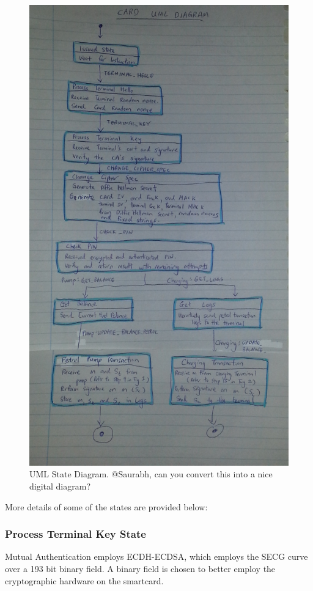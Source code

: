 \documentclass[a4paper,10pt]{llncs}
\begin{document}
    \begin{figure}
      \centering
      \includegraphics[scale=0.38]{img/state.jpg}
      \caption{\label{figure:state}UML State Diagram. @Saurabh, can you convert this into a nice digital diagram?}
    \end{figure}  



More details of some of the states are provided below:
\subsubsection{Process Terminal Key State}
Mutual Authentication employs ECDH-ECDSA, which employs the SECG curve over a 193 bit binary field. A binary field is chosen to better employ the cryptographic hardware on the smartcard. 
\end{document}
